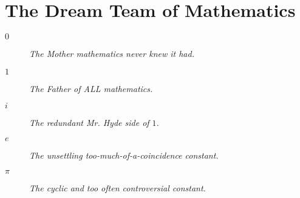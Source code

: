 \section*{The Dream Team of Mathematics}

\begin{description}
    \item[$0$] \textit{The Mother mathematics never knew it had.}
    \item[$1$] \textit{The Father of ALL mathematics.}
    \item[$i$] \textit{The redundant Mr. Hyde side of $1$.}
    \item[$e$] \textit{The unsettling too-much-of-a-coincidence constant.}
    \item[$\pi$] \textit{The cyclic and too often controversial constant.}
\end{description}

